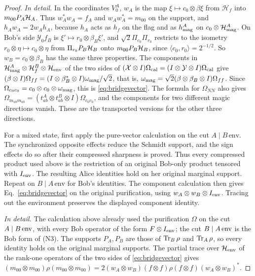\begin{proof}
\emph{In detail.} In the coordinates $V^A_0$, $w_A$ is the map $\xi\mapsto c_0\otimes\beta\xi$ from $\mathcal H_f$ into $m_{00}P_A\mathcal H_A$. Thus $w_A^*w_A=f_A$ and $w_Aw_A^*=m_{00}$ on the support, and $h_Aw_A=2w_Ah_A$, because $h_A$ acts as $h_f$ on the flag and as $h^A_{\rm mag}$ on $c_0\otimes\mathcal H^A_{\rm mag}$. On Bob's side $\mathcal Y_0f_B$ is $\xi'\mapsto r_0\otimes\beta_B\xi'$, and $\sqrt2\Pi_{c_0}\Pi_{r_0}$ restricts to the isometry $r_0\otimes\eta\mapsto c_0\otimes\eta$ from $\Pi_{r_0}P_B\mathcal H_B$ onto $m_{00}P_B\mathcal H_B$, since $\langle c_0,r_0\rangle=2^{-1/2}$. So $w_B=c_0\otimes\beta_B$ has the same three properties. The components in $\mathcal H^A_{\rm mag}\otimes\mathcal H^B_f\otimes\mathcal H_{\rm env}$ of the two sides of $(\mathcal X\otimes I)\Omega_{\rm cal}=(I\otimes\mathcal Y\otimes I)\Omega_{\rm cal}$ give $(\beta\otimes I)\Omega_{ff}=(I\otimes\beta_B^*\otimes I)\omega_{\rm mag}/\sqrt2$, that is, $\omega_{\rm mag}=\sqrt2(\beta\otimes\beta_B\otimes I)\Omega_{ff}$. Since $\Omega_{c_0c_0}=c_0\otimes c_0\otimes\omega_{\rm mag}$, this is \eqref{eq:bridgevector}. The formula for $\Omega_{NN}$ also gives $\Omega_{m_{ab}m_{ab}}=(t^A_{ab}\otimes t^B_{ab}\otimes I)\Omega_{c_0c_0}$, and the components for two different magic directions vanish. These are the transported versions for the other three directions.

For a mixed state, first apply the pure-vector calculation on the cut $A\mid B\,\mathrm{env}$. The synchronized opposite effects reduce the Schmidt support, and the sign effects do so after their compressed sharpness is proved. Thus every compressed product used above is the restriction of an original Bob-only product tensored with $I_{\rm env}$. The resulting Alice identities hold on her original marginal support. Repeat on $B\mid A\,\mathrm{env}$ for Bob's identities. The component calculation then gives Eq.~\eqref{eq:bridgevector} on the original purification, using $w_A\otimes w_B\otimes I_{\rm env}$. Tracing out the environment preserves the displayed component identity.

\emph{In detail.} The calculation above already used the purification $\Omega$ on the cut $A\mid B\,{\rm env}$, with every Bob operator of the form $F\otimes I_{\rm env}$; the cut $B\mid A\,{\rm env}$ is the Bob form of (N3). The supports $P_A,P_B$ are those of $\operatorname{Tr}_B\rho$ and $\operatorname{Tr}_A\rho$, so every identity holds on the original marginal supports. The partial trace over $\mathcal H_{\rm env}$ of the rank-one operators of the two sides of \eqref{eq:bridgevector} gives $(m_{00}\otimes m_{00})\rho(m_{00}\otimes m_{00})=2(w_A\otimes w_B)(f\otimes f)\rho(f\otimes f)(w_A\otimes w_B)^*$.
\end{proof}

